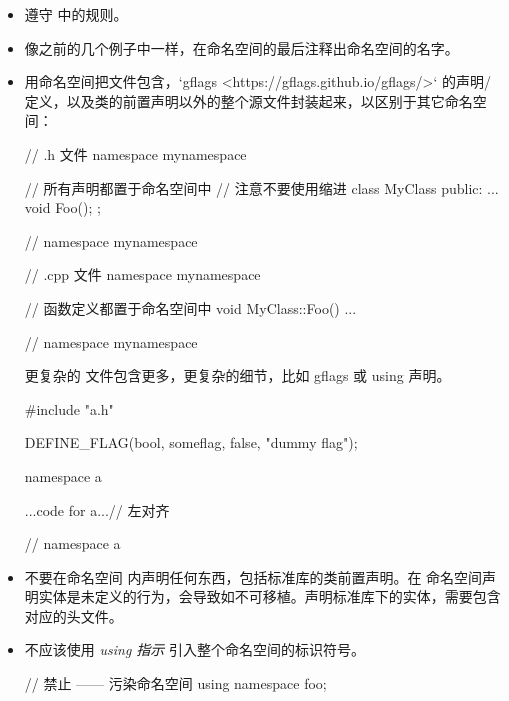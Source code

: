 \begin{itemize}
  \item 遵守  中的规则。
  \item 像之前的几个例子中一样，在命名空间的最后注释出命名空间的名字。
  \item 用命名空间把文件包含，`gflags <https://gflags.github.io/gflags/>` 的声明/定义，以及类的前置声明以外的整个源文件封装起来，以区别于其它命名空间：

\begin{cppcode}
  // .h 文件
namespace mynamespace {

// 所有声明都置于命名空间中
// 注意不要使用缩进
class MyClass {
public:
...
void Foo();
};

} // namespace mynamespace
\end{cppcode}

\begin{cppcode}
// .cpp 文件
namespace mynamespace {

// 函数定义都置于命名空间中
void MyClass::Foo() {
...
}

} // namespace mynamespace
\end{cppcode}

更复杂的  文件包含更多，更复杂的细节，比如 gflags 或 using 声明。

\begin{cppcode}
#include "a.h"

DEFINE_FLAG(bool, someflag, false, "dummy flag");

namespace a {

...code for a...// 左对齐

} // namespace a
\end{cppcode}

  \item 不要在命名空间  内声明任何东西，包括标准库的类前置声明。在  命名空间声明实体是未定义的行为，会导致如不可移植。声明标准库下的实体，需要包含对应的头文件。

  \item 不应该使用 \textit{using 指示} 引入整个命名空间的标识符号。

\begin{cppcode}
// 禁止 —— 污染命名空间
using namespace foo;
\end{cppcode}


\end{itemize}
